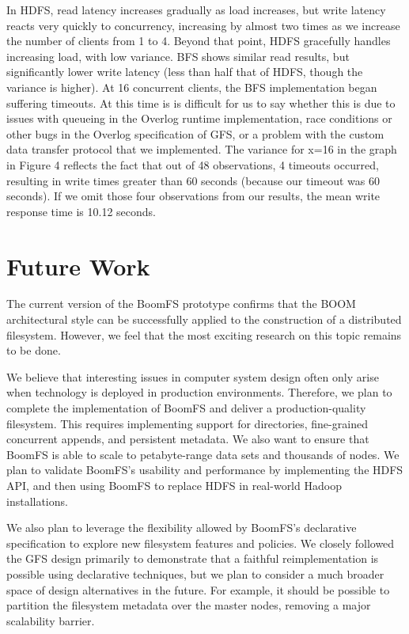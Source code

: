 \documentclass{article}
\begin{document}
In HDFS, read latency increases gradually as load increases, but write
latency reacts very quickly to concurrency, increasing by almost two
times as we increase the number of clients from 1 to 4.  Beyond that
point, HDFS gracefully handles increasing load, with low variance.
BFS shows similar read results, but significantly lower write latency
(less than half that of HDFS, though the variance is higher).  At 16
concurrent clients, the BFS implementation began suffering timeouts.
At this time is is difficult for us to say whether this is due to
issues with queueing in the Overlog runtime implementation, race
conditions or other bugs in the Overlog specification of GFS, or a
problem with the custom data transfer protocol that we implemented.
The variance for x=16 in the graph in Figure 4 reflects the fact that
out of 48 observations, 4 timeouts occurred, resulting in write times
greater than 60 seconds (because our timeout was 60 seconds).  If we
omit those four observations from our results, the mean write response
time is 10.12 seconds.

\section{Future Work}
\label{future-work}
The current version of the BoomFS prototype confirms that the BOOM
architectural style can be successfully applied to the construction of
a distributed filesystem. However, we feel that the most exciting
research on this topic remains to be done.

We believe that interesting issues in computer system design often
only arise when technology is deployed in production
environments. Therefore, we plan to complete the implementation of
BoomFS and deliver a production-quality filesystem. This requires
implementing support for directories, fine-grained concurrent appends,
and persistent metadata. We also want to ensure that BoomFS is able to
scale to petabyte-range data sets and thousands of nodes. We plan to
validate BoomFS's usability and performance by implementing the HDFS
API, and then using BoomFS to replace HDFS in real-world Hadoop
installations.

We also plan to leverage the flexibility allowed by BoomFS's
declarative specification to explore new filesystem features and
policies. We closely followed the GFS design primarily to demonstrate
that a faithful reimplementation is possible using declarative
techniques, but we plan to consider a much broader space of design
alternatives in the future. For example, it should be possible to
partition the filesystem metadata over the master nodes, removing a
major scalability barrier.
\end{document}
